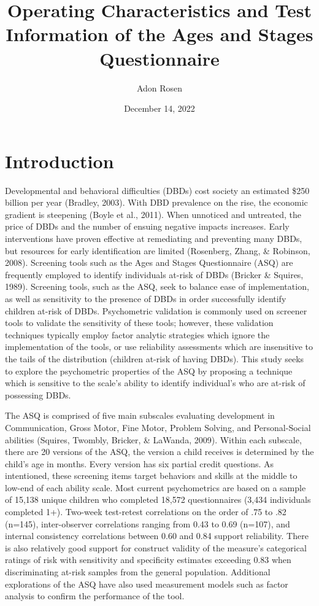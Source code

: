 \documentclass[
  11pt,
]{article}
\title{\textbf{Operating Characteristics and Test Information of the
Ages and Stages Questionnaire}}
\author{Adon Rosen}
\date{December 14, 2022}
\begin{document}
\maketitle

\hypertarget{introduction}{%
\section{Introduction}\label{introduction}}

Developmental and behavioral difficulties (DBDs) cost society an
estimated \$250 billion per year (Bradley, 2003). With DBD prevalence on
the rise, the economic gradient is steepening (Boyle et al., 2011). When
unnoticed and untreated, the price of DBDs and the number of ensuing
negative impacts increases. Early interventions have proven effective at
remediating and preventing many DBDs, but resources for early
identification are limited (Rosenberg, Zhang, \& Robinson, 2008).
Screening tools such as the Ages and Stages Questionnaire (ASQ) are
frequently employed to identify individuals at-risk of DBDs (Bricker \&
Squires, 1989). Screening tools, such as the ASQ, seek to balance ease
of implementation, as well as sensitivity to the presence of DBDs in
order successfully identify children at-risk of DBDs. Psychometric
validation is commonly used on screener tools to validate the
sensitivity of these tools; however, these validation techniques
typically employ factor analytic strategies which ignore the
implementation of the tools, or use reliability assessments which are
insensitive to the tails of the distribution (children at-risk of having
DBDs). This study seeks to explore the psychometric properties of the
ASQ by proposing a technique which is sensitive to the scale's ability
to identify individual's who are at-risk of possessing DBDs.

The ASQ is comprised of five main subscales evaluating development in
Communication, Gross Motor, Fine Motor, Problem Solving, and
Personal-Social abilities (Squires, Twombly, Bricker, \& LaWanda, 2009).
Within each subscale, there are 20 versions of the ASQ, the version a
child receives is determined by the child's age in months. Every version
has six partial credit questions. As intentioned, these screening items
target behaviors and skills at the middle to low-end of each ability
scale. Most current psychometrics are based on a sample of 15,138 unique
children who completed 18,572 questionnaires (3,434 individuals
completed 1+). Two-week test-retest correlations on the order of .75 to
.82 (n=145), inter-observer correlations ranging from 0.43 to 0.69
(n=107), and internal consistency correlations between 0.60 and 0.84
support reliability. There is also relatively good support for construct
validity of the measure's categorical ratings of risk with sensitivity
and specificity estimates exceeding 0.83 when discriminating at-risk
samples from the general population. Additional explorations of the ASQ
have also used measurement models such as factor analysis to confirm the
performance of the tool.
\end{document}
